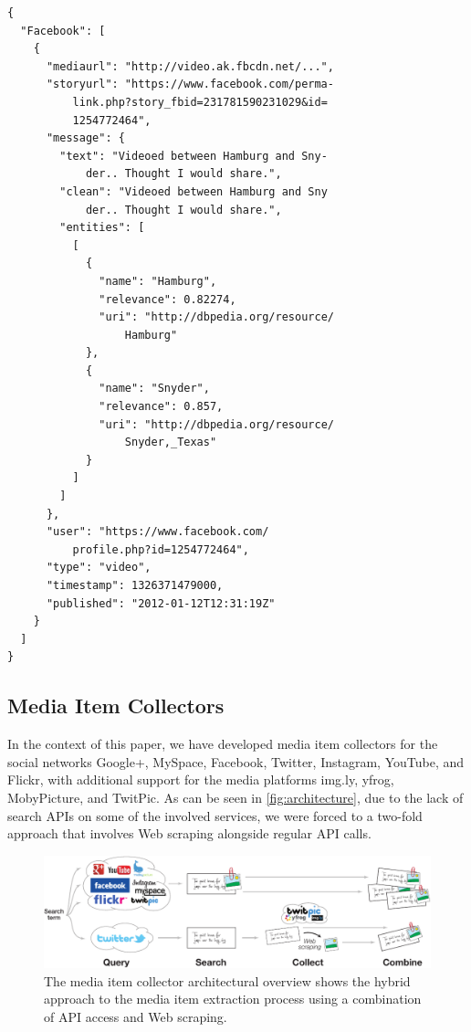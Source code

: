 \documentclass{acm_proc_article-sp}
\begin{document}
\begin{lstlisting}[caption={Sample output of the media collector showing a Facebook post processed with named entity extraction and disambiguation (slightly edited for legibility).},label={lst:media}]
{
  "Facebook": [
    {
      "mediaurl": "http://video.ak.fbcdn.net/...",
      "storyurl": "https://www.facebook.com/perma-
          link.php?story_fbid=231781590231029&id=
          1254772464",
      "message": {
        "text": "Videoed between Hamburg and Sny-
            der.. Thought I would share.",
        "clean": "Videoed between Hamburg and Sny
            der.. Thought I would share.",
        "entities": [
          [
            {
              "name": "Hamburg",
              "relevance": 0.82274,
              "uri": "http://dbpedia.org/resource/
                  Hamburg"
            },
            {
              "name": "Snyder",
              "relevance": 0.857,
              "uri": "http://dbpedia.org/resource/
                  Snyder,_Texas"
            }
          ]
        ]
      },
      "user": "https://www.facebook.com/
          profile.php?id=1254772464",
      "type": "video",
      "timestamp": 1326371479000,
      "published": "2012-01-12T12:31:19Z"
    }
  ]
}
\end{lstlisting}

\subsection{Media Item Collectors}
In the context of this paper, we have developed media item collectors for the social networks Google+, MySpace, Facebook, Twitter, Instagram, YouTube, and Flickr,
with additional support for the media platforms img.ly, yfrog, MobyPicture, and TwitPic.
As can be seen in \autoref{fig:architecture},
due to the lack of search APIs on some of the involved services,
we were forced to a two-fold approach that involves Web scraping alongside regular API calls.

\begin{figure}
\centering
\includegraphics[width=1.0\linewidth]{./resources/architecture.pdf}
\caption{The media item collector architectural overview shows the hybrid approach to the media item extraction process using a combination of API access and Web scraping.}
\label{fig:architecture}
\end{figure}
\end{document}
